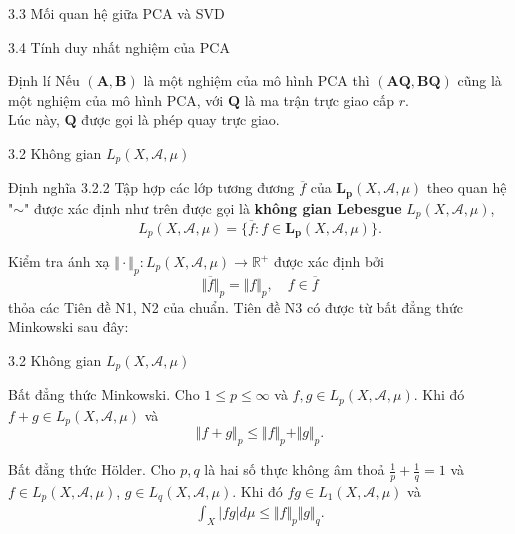 \documentclass[notheorems,envcountsect,hyperref=unicode]{beamer}
\newcommand{\R}{\mathbb R}
\def\A{\mathcal{A}}
\def\R{\mathbb{R}}
\def\Lp{\mathbf{L_p}}
\def\Lpp{\mathit{L_p}}
\def\disint{\displaystyle\int}
\def\kgdd{(X,\A,\mu)}
\begin{document}
\begin{frame}{3.3 Mối quan hệ giữa PCA và SVD}
	
	
\end{frame}
\begin{frame}{3.4 Tính duy nhất nghiệm của PCA }
\begin{block}{\textnormal{Định lí}}
Nếu $(\mathbf{A, B})$ là một nghiệm của mô hình PCA thì $(\mathbf{A Q, B Q})$ cũng là một nghiệm của mô hình PCA, với $\mathbf{Q}$ là ma trận trực giao cấp $r$.\\
Lúc này, $\mathbf{Q}$ được gọi là phép quay trực giao.
\end{block}
%
%
\end{frame}

\begin{frame}{3.2 Không gian $\Lpp\kgdd$ }
\begin{block}{\textnormal{Định nghĩa 3.2.2}}
Tập hợp các lớp tương đương $\overline{f}$ của $\Lp\kgdd$ theo quan hệ "$\sim$" được xác định như trên được gọi là \textbf{không gian Lebesgue} $\Lpp\kgdd$,
$$\Lpp\kgdd=\lbrace \overline{f}:f\in \Lp\kgdd\rbrace.$$
\end{block}
Kiểm tra ánh xạ $\Vert \cdot\Vert_{p}: \Lpp\kgdd\to \R^+$ được xác định bởi
$$\Vert \overline{f}\Vert_p=\Vert f\Vert_p, \quad f\in \overline{f}$$
thỏa các Tiên đề N1, N2 của chuẩn. Tiên đề N3 có được từ bất đẳng thức Minkowski sau đây:
\end{frame}

\begin{frame}{3.2 Không gian $\Lpp\kgdd$ }
\begin{block}{\textnormal{Bất đẳng thức Minkowski.}}
Cho $1\leq p\leq \infty$ và $f,g\in \Lpp\kgdd$. Khi đó $f+g\in \Lpp\kgdd$ và
$$\Vert f+g\Vert_p\leq \Vert f\Vert_p+\Vert g\Vert_p.$$
\end{block}
\pause
\begin{block}{\textnormal{Bất đẳng thức Hölder.}}
Cho $p,q$ là hai số thực không âm thoả $\frac{1}{p}+\frac{1}{q}=1$ và $f\in \Lpp\kgdd$, $g\in\mathit{L}_q\kgdd$. Khi đó $fg\in \mathit{L}_1\kgdd$ và
\begin{align*}
\disint_X \vert fg\vert d\mu \leq \Vert f\Vert_p\Vert g\Vert_q.
\end{align*}
\end{block}
\end{frame}
\end{document}
